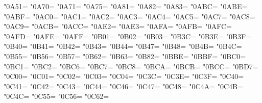 \XeTeXcharclass"0A51=\KclassCM
\XeTeXcharclass"0A70=\KclassCM
\XeTeXcharclass"0A71=\KclassCM
\XeTeXcharclass"0A75=\KclassCM
\XeTeXcharclass"0A81=\KclassCM
\XeTeXcharclass"0A82=\KclassCM
\XeTeXcharclass"0A83=\KclassCM
\XeTeXcharclass"0ABC=\KclassCM
\XeTeXcharclass"0ABE=\KclassCM
\XeTeXcharclass"0ABF=\KclassCM
\XeTeXcharclass"0AC0=\KclassCM
\XeTeXcharclass"0AC1=\KclassCM
\XeTeXcharclass"0AC2=\KclassCM
\XeTeXcharclass"0AC3=\KclassCM
\XeTeXcharclass"0AC4=\KclassCM
\XeTeXcharclass"0AC5=\KclassCM
\XeTeXcharclass"0AC7=\KclassCM
\XeTeXcharclass"0AC8=\KclassCM
\XeTeXcharclass"0AC9=\KclassCM
\XeTeXcharclass"0ACB=\KclassCM
\XeTeXcharclass"0ACC=\KclassCM
\XeTeXcharclass"0AE2=\KclassCM
\XeTeXcharclass"0AE3=\KclassCM
\XeTeXcharclass"0AFA=\KclassCM
\XeTeXcharclass"0AFB=\KclassCM
\XeTeXcharclass"0AFC=\KclassCM
\XeTeXcharclass"0AFD=\KclassCM
\XeTeXcharclass"0AFE=\KclassCM
\XeTeXcharclass"0AFF=\KclassCM
\XeTeXcharclass"0B01=\KclassCM
\XeTeXcharclass"0B02=\KclassCM
\XeTeXcharclass"0B03=\KclassCM
\XeTeXcharclass"0B3C=\KclassCM
\XeTeXcharclass"0B3E=\KclassCM
\XeTeXcharclass"0B3F=\KclassCM
\XeTeXcharclass"0B40=\KclassCM
\XeTeXcharclass"0B41=\KclassCM
\XeTeXcharclass"0B42=\KclassCM
\XeTeXcharclass"0B43=\KclassCM
\XeTeXcharclass"0B44=\KclassCM
\XeTeXcharclass"0B47=\KclassCM
\XeTeXcharclass"0B48=\KclassCM
\XeTeXcharclass"0B4B=\KclassCM
\XeTeXcharclass"0B4C=\KclassCM
\XeTeXcharclass"0B55=\KclassCM
\XeTeXcharclass"0B56=\KclassCM
\XeTeXcharclass"0B57=\KclassCM
\XeTeXcharclass"0B62=\KclassCM
\XeTeXcharclass"0B63=\KclassCM
\XeTeXcharclass"0B82=\KclassCM
\XeTeXcharclass"0BBE=\KclassCM
\XeTeXcharclass"0BBF=\KclassCM
\XeTeXcharclass"0BC0=\KclassCM
\XeTeXcharclass"0BC1=\KclassCM
\XeTeXcharclass"0BC2=\KclassCM
\XeTeXcharclass"0BC6=\KclassCM
\XeTeXcharclass"0BC7=\KclassCM
\XeTeXcharclass"0BC8=\KclassCM
\XeTeXcharclass"0BCA=\KclassCM
\XeTeXcharclass"0BCB=\KclassCM
\XeTeXcharclass"0BCC=\KclassCM
\XeTeXcharclass"0BD7=\KclassCM
\XeTeXcharclass"0C00=\KclassCM
\XeTeXcharclass"0C01=\KclassCM
\XeTeXcharclass"0C02=\KclassCM
\XeTeXcharclass"0C03=\KclassCM
\XeTeXcharclass"0C04=\KclassCM
\XeTeXcharclass"0C3C=\KclassCM
\XeTeXcharclass"0C3E=\KclassCM
\XeTeXcharclass"0C3F=\KclassCM
\XeTeXcharclass"0C40=\KclassCM
\XeTeXcharclass"0C41=\KclassCM
\XeTeXcharclass"0C42=\KclassCM
\XeTeXcharclass"0C43=\KclassCM
\XeTeXcharclass"0C44=\KclassCM
\XeTeXcharclass"0C46=\KclassCM
\XeTeXcharclass"0C47=\KclassCM
\XeTeXcharclass"0C48=\KclassCM
\XeTeXcharclass"0C4A=\KclassCM
\XeTeXcharclass"0C4B=\KclassCM
\XeTeXcharclass"0C4C=\KclassCM
\XeTeXcharclass"0C55=\KclassCM
\XeTeXcharclass"0C56=\KclassCM
\XeTeXcharclass"0C62=\KclassCM

